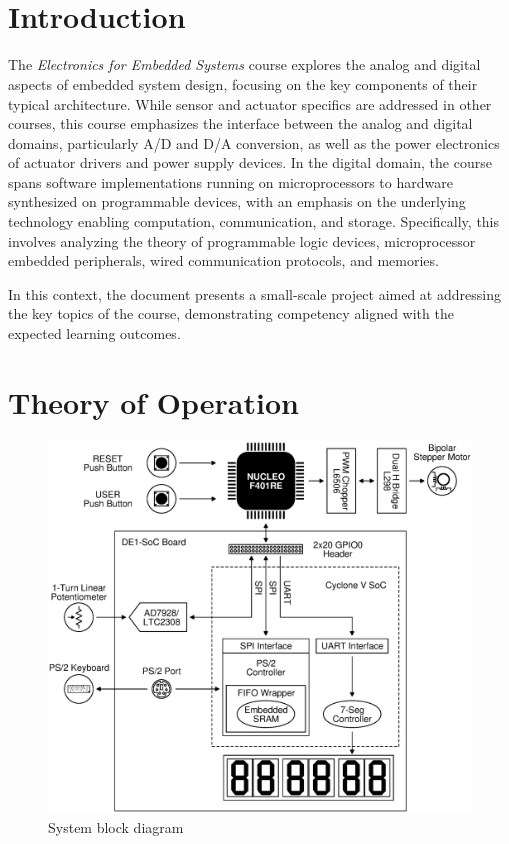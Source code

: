 \documentclass[]{article}
\title{\textbf{\Course}\\\Title}
\author{\Authors}
\date{\Date}
\begin{document}

\maketitle
\tableofcontents
\vfill
\printbibliography
\clearpage

\section{Introduction}

The \emph{Electronics for Embedded Systems} course explores the analog and digital aspects of embedded system design, focusing on the key components of their typical architecture. While sensor and actuator specifics are addressed in other courses, this course emphasizes the interface between the analog and digital domains, particularly A/D and D/A conversion, as well as the power electronics of actuator drivers and power supply devices. In the digital domain, the course spans software implementations running on microprocessors to hardware synthesized on programmable devices, with an emphasis on the underlying technology enabling computation, communication, and storage. Specifically, this involves analyzing the theory of programmable logic devices, microprocessor embedded peripherals, wired communication protocols, and memories.

In this context, the document presents a small-scale project aimed at addressing the key topics of the course, demonstrating competency aligned with the expected learning outcomes.

\section{Theory of Operation}\label{sec:theory_operation}

\begin{figure}
    \centering
    \includegraphics[width=\linewidth]{../gfx/system_diagram.eps}
    \caption{System block diagram}
    \label{fig:sys}
\end{figure}
\end{document}
